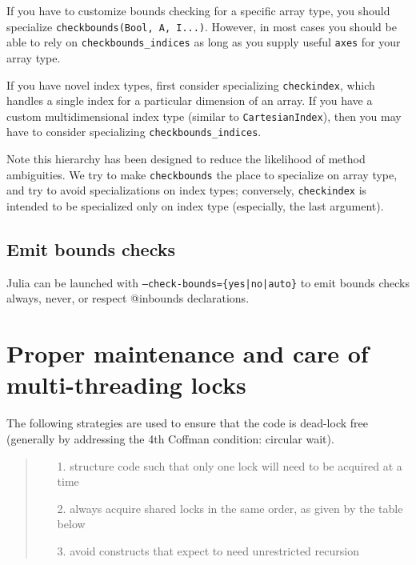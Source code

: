 If you have to customize bounds checking for a specific array type, you should specialize \texttt{checkbounds(Bool, A, I...)}. However, in most cases you should be able to rely on \texttt{checkbounds\_indices} as long as you supply useful \texttt{axes} for your array type.



If you have novel index types, first consider specializing \texttt{checkindex}, which handles a single index for a particular dimension of an array.  If you have a custom multidimensional index type (similar to \texttt{CartesianIndex}), then you may have to consider specializing \texttt{checkbounds\_indices}.



Note this hierarchy has been designed to reduce the likelihood of method ambiguities.  We try to make \texttt{checkbounds} the place to specialize on array type, and try to avoid specializations on index types; conversely, \texttt{checkindex} is intended to be specialized only on index type (especially, the last argument).



\hypertarget{15511139749343586557}{}


\subsection{Emit bounds checks}



Julia can be launched with \texttt{--check-bounds=\{yes|no|auto\}} to emit bounds checks always, never, or respect @inbounds declarations.



\hypertarget{17038639605096915302}{}


\section{Proper maintenance and care of multi-threading locks}



The following strategies are used to ensure that the code is dead-lock free (generally by addressing the 4th Coffman condition: circular wait).



\begin{quote}
\begin{itemize}
\item[1. ] structure code such that only one lock will need to be acquired at a time


\item[2. ] always acquire shared locks in the same order, as given by the table below


\item[3. ] avoid constructs that expect to need unrestricted recursion

\end{itemize}
\end{quote}


